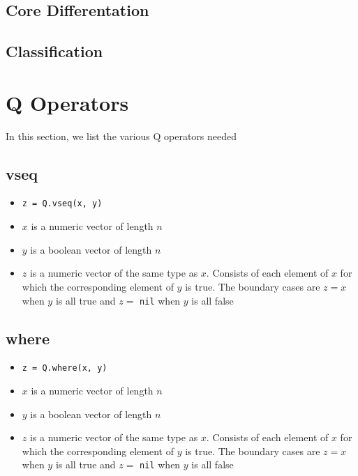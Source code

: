 \subsection{Core Differentation}
\label{Differentation}

\subsection{Classification}
\label{Classification}




\section{Q Operators}

In this section, we list the various Q operators needed
\subsection{vseq}
\label{vseq}

\begin{itemize}
\item \verb+z = Q.vseq(x, y)+ 
\item \(x\) is a numeric vector of length \(n\)
\item \(y\) is a boolean vector of length \(n\)
\item \(z\) is a numeric vector of the same type as \(x\). Consists of each
element of \(x\) for which the corresponding element of \(y\) is true. The
boundary cases are \(z = x\) when \(y\) is all true and \(z =\) {\tt nil} when
\(y\) is all false
\end{itemize}

\subsection{where}
\label{where}

\begin{itemize}
\item \verb+z = Q.where(x, y)+ 
\item \(x\) is a numeric vector of length \(n\)
\item \(y\) is a boolean vector of length \(n\)
\item \(z\) is a numeric vector of the same type as \(x\). Consists of each
element of \(x\) for which the corresponding element of \(y\) is true. The
boundary cases are \(z = x\) when \(y\) is all true and \(z =\) {\tt nil} when
\(y\) is all false
\end{itemize}

